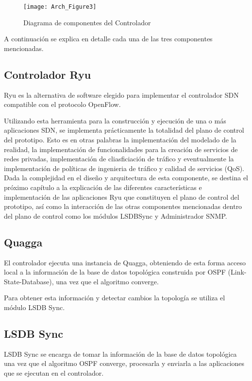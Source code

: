 \begin{figure}[h] 
\centering    
\texttt{[image: Arch\_Figure3]}
\caption[Diagrama de componentes del Controlador]{Diagrama de componentes del Controlador}
\label{fig:OpenSourceRArch3}
\end{figure}

A continuación se explica en detalle cada una de las tres componentes mencionadas.

\subsection{Controlador Ryu}
Ryu es la alternativa de software elegido para implementar el controlador SDN compatible con el protocolo OpenFlow. 

Utilizando esta herramienta para la construcci\'on y ejecuci\'on de una o m\'as aplicaciones SDN, se implementa prácticamente la totalidad del plano de control del prototipo. Esto es en otras palabras la implementaci\'on del modelado de la realidad, la implementaci\'on de funcionalidades para la creaci\'on de servicios de redes privadas, implementaci\'on de cliasficiaci\'on de tr\'afico y eventualmente la implementaci\'on de pol\'iticas de ingenieria de tr\'afico y calidad de servicios (QoS).\\ 

Dada la complejidad en el diseño y arquitectura de esta componente, se destina el próximo cap\'itulo a la explicaci\'on de las diferentes características e implementaci\'on de las aplicaciones Ryu que constituyen el plano de control del prototipo, as\'i como la interacci\'on de las otras componentes mencionadas dentro del plano de control como los m\'odulos LSDBSync y Administrador SNMP. 

\subsection{Quagga}
El controlador ejecuta una instancia de Quagga, obteniendo de esta forma acceso local a la información de la base de datos topol\'ogica construida por OSPF (Link-State-Database), una vez que el algoritmo converge.

Para obtener esta informaci\'on y detectar cambios la topolog\'ia se utiliza el m\'odulo LSDB Sync.

\subsection{LSDB Sync}
LSDB Sync se encarga de tomar la información de la base de datos topol\'ogica una vez que el algoritmo OSPF converge, procesarla y enviarla a las aplicaciones que se ejecutan en el controlador.\\

